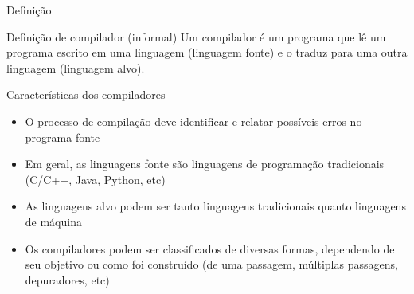 \begin{frame}[fragile]{Definição}

    \begin{block}{Definição de compilador (informal)}
        Um compilador é um programa que lê um programa escrito em uma linguagem (linguagem fonte) e o traduz para uma outra linguagem (linguagem alvo).
    \end{block}

    \pause

    \vspace{0.2in}

    \begin{center}
    \end{center}

\end{frame}

\begin{frame}[fragile]{Características dos compiladores}

    \begin{itemize}
        \item O processo de compilação deve identificar e relatar possíveis erros no programa fonte
        \pause

        \item Em geral, as linguagens fonte são linguagens de programação tradicionais (C/C++, Java, Python, etc)
        \pause

        \item As linguagens alvo podem ser tanto linguagens tradicionais quanto linguagens de máquina
        \pause

        \item Os compiladores podem ser classificados de diversas formas, dependendo de seu objetivo ou como foi construído (de uma passagem, múltiplas passagens,
            depuradores, etc)
    \end{itemize}

\end{frame}

